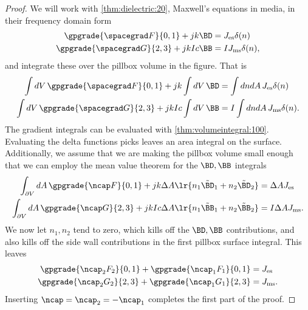 \begin{proof}
We will work with \cref{thm:dielectric:20}, Maxwell's equations in media, in their frequency domain form
\begin{equation}\label{eqn:boundarySurfaceSources:480}
\begin{aligned}
\gpgrade{ \spacegrad F }{0,1} + j k \BD &= J_{\textrm{es}} \delta(n) \\
\gpgrade{ \spacegrad G }{2,3} + j k I c \BB &= I J_{\textrm{ms}} \delta(n),
\end{aligned}
\end{equation}
and integrate these over the pillbox volume in the figure.  That is
\begin{equation}\label{eqn:boundarySurfaceSources:500}
\begin{aligned}
\int dV\, \gpgrade{ \spacegrad F }{0,1} + j k \int dV\, \BD &= \int dn dA\, J_{\textrm{es}} \delta(n) \\
\int dV\, \gpgrade{ \spacegrad G }{2,3} + j k I c \int dV\, \BB &= I \int dn dA\, J_{\textrm{ms}} \delta(n).
\end{aligned}
\end{equation}
The gradient integrals can be evaluated with \cref{thm:volumeintegral:100}.  Evaluating the delta functions picks leaves an area integral on the surface.  Additionally, we assume that we are making the pillbox volume small enough that we can employ the mean value theorem for the \( \BD, \BB \) integrals
\begin{equation}\label{eqn:boundarySurfaceSources:520}
\begin{aligned}
\int_{\partial V} dA\, \gpgrade{ \ncap F }{0,1} + j k \Delta A \lr{ n_1 \tilde{\BD}_1 + n_2 \tilde{\BD}_2 } &= \Delta A J_{\textrm{es}} \\
\int_{\partial V} dA\, \gpgrade{ \ncap G }{2,3} + j k I c \Delta A \lr{ n_1 \tilde{\BB}_1 + n_2 \tilde{\BB}_2} &= I \Delta A J_{\textrm{ms}}.
\end{aligned}
\end{equation}
We now let \( n_1, n_2 \) tend to zero, which kills off the \( \BD, \BB \) contributions, and also kills off the side wall contributions in the first pillbox surface integral.  This leaves
\begin{equation}\label{eqn:boundarySurfaceSources:540}
\begin{aligned}
\gpgrade{ \ncap_2 F_2 }{0,1} + \gpgrade{ \ncap_1 F_1 }{0,1} &= J_{\textrm{es}} \\
\gpgrade{ \ncap_2 G_2 }{2,3} + \gpgrade{ \ncap_1 G_1 }{2,3} &= J_{\textrm{ms}}.
\end{aligned}
\end{equation}
Inserting \( \ncap = \ncap_2 = -\ncap_1 \) completes the first part of the proof.


\end{proof}
